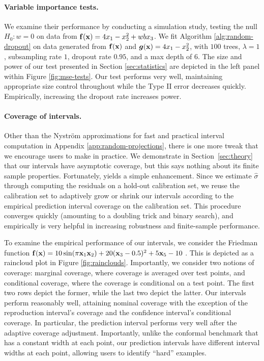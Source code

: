 \vspace{-2ex}    
\paragraph{Variable importance tests.} We examine their performance by conducting a simulation study, testing the null $H_0:w=0$ on data from $\mathbf{f}(\mathbf{x})=4 x_1 -x^2_2+w bx_3$. We fit Algorithm \ref{alg:random-dropout} on data generated from $\mathbf{f}(\mathbf{x})$ and $\bm{g}(\mathbf{x})=4 x_1 - x^2_2$, with $100$ trees, $\lambda=1$, subsampling rate $1$, dropout rate $0.95$, and a max depth of $6$. The size and power of our test presented in Section \ref{sec:statistics} are depicted in the left panel within Figure \ref{fig:mse-tests}. Our test performs very well, maintaining appropriate size control throughout while the Type II error decreases quickly. Empirically, increasing the dropout rate increases power.
\vspace{-2ex}  
\paragraph{Coverage of intervals.}
\label{sec:coverage-experiments}
Other than the Nystr\"{o}m approximations for fast and practical interval computation in Appendix \ref{app:random-projections}, there is one more tweak that we encourage users to make in practice. We demonstrate in Section~\ref{sec:theory} that our intervals have asymptotic coverage, but this says nothing about its finite sample properties. Fortunately, \cite{candes2020adaptivecoverage} yields a simple enhancement. Since we estimate $\widehat{\sigma}$ through computing the residuals on a hold-out calibration set, we reuse the calibration set to adaptively grow or shrink our intervals according to the empirical prediction interval coverage on the calibration set. This procedure converges quickly (amounting to a doubling trick and binary search), and empirically is very helpful in increasing robustness and finite-sample performance.

To examine the empirical performance of our intervals, we consider the Friedman function $\mathbf{f}(\mathbf{x}) = 10\sin(\pi \mathbf{x}_{1}\mathbf{x}_{2})+20(\mathbf{x}_{3}-0.5)^{2}+5\mathbf{x}_{5}-10$ \citep{friedman2001greedy}. This is depicted as a raincloud plot in Figure \ref{fig:rainclouds}. Importantly, we consider two notions of coverage: marginal coverage, where coverage is averaged over test points, and conditional coverage, where the coverage is conditional on a test point. The first two rows depict the former, while the last two depict the latter. Our intervals perform reasonably well, attaining nominal coverage with the exception of the reproduction interval's coverage and the confidence interval's conditional coverage. In particular, the prediction interval performs very well after the adaptive coverage adjustment. Importantly, unlike the conformal benchmark that has a constant width at each point, our prediction intervals have different interval widths at each point, allowing users to identify ``hard'' examples. 

